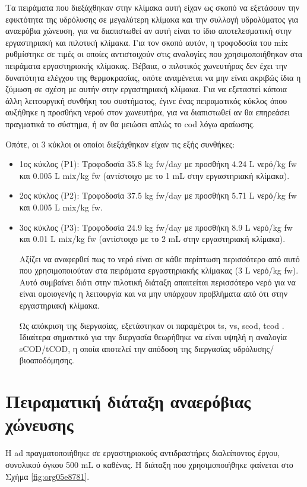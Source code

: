 \documentclass[11pt]{report}
\begin{document}
Τα πειράματα που διεξάχθηκαν στην κλίμακα αυτή είχαν ως σκοπό να εξετάσουν την εφικτότητα της υδρόλυσης σε μεγαλύτερη κλίμακα και την συλλογή υδρολύματος για αναερόβια χώνευση, για να διαπιστωθεί αν αυτή είναι το ίδιο αποτελεσματική στην εργαστηριακή και πιλοτική κλίμακα. Για τον σκοπό αυτόν, η τροφοδοσία του \acrshort{mix} ρυθμίστηκε σε τιμές οι οποίες αντιστοιχούν στις αναλογίες που χρησιμοποιήθηκαν στα πειράματα εργαστηριακής κλίμακας. Βέβαια, ο πιλοτικός χωνευτήρας δεν έχει την δυνατότητα ελέγχου της θερμοκρασίας, οπότε αναμένεται να μην είναι ακριβώς ίδια η ζύμωση σε σχέση με αυτήν στην εργαστηριακή κλίμακα. Για να εξεταστεί κάποια άλλη λειτουργική συνθήκη του συστήματος, έγινε ένας πειραματικός κύκλος όπου αυξήθηκε η προσθήκη νερού στον χωνευτήρα, για να διαπιστωθεί αν θα επηρεάσει πραγματικά το σύστημα, ή αν θα μειώσει απλώς το \acrshort{cod} λόγω αραίωσης.

Οπότε, οι 3 κύκλοι οι οποίοι διεξάχθηκαν είχαν τις εξής συνθήκες:
\begin{itemize}
\item 1ος κύκλος (P1): Τροφοδοσία 35.8 kg \acrshort{fw}/day με προσθήκη 4.24 L νερό/kg \acrshort{fw} και 0.005 L \acrshort{mix}/kg \acrshort{fw} (αντίστοιχο με το 1 mL στην εργαστηριακή κλίμακα).
\item 2ος κύκλος (P2): Τροφοδοσία 37.5 kg \acrshort{fw}/day με προσθήκη 5.71 L νερό/kg \acrshort{fw} και 0.005 L \acrshort{mix}/kg \acrshort{fw}.
\item 3ος κύκλος (P3): Τροφοδοσία 24.9 kg \acrshort{fw}/day με προσθήκη 8.9 L νερό/kg \acrshort{fw} και 0.01 L \acrshort{mix}/kg \acrshort{fw} (αντίστοιχο με το 2 mL στην εργαστηριακή κλίμακα).

Αξίζει να αναφερθεί πως το νερό είναι σε κάθε περίπτωση περισσότερο από αυτό που χρησιμοποιούταν στα πειράματα εργαστηριακής κλίμακας (3 L νερό/kg \acrshort{fw}). Αυτό συμβαίνει διότι στην πιλοτική διάταξη απαιτείται περισσότερο νερό για να είναι ομοιογενής η λειτουργία και να μην υπάρχουν προβλήματα από ότι στην εργαστηριακή κλίμακα.

Ως απόκριση της διεργασίας, εξετάστηκαν οι παραμέτροι \acrshort{ts}, \acrshort{vs}, \acrshort{scod}, \acrshort{tcod} . Ιδιαίτερα σημαντικό για την διεργασία θεωρήθηκε να είναι υψηλή η αναλογία sCOD/tCOD, η οποία αποτελεί την απόδοση της διεργασίας υδρόλυσης/βιοαποδόμησης.
\end{itemize}

\section{Πειραματική διάταξη αναερόβιας χώνευσης}
\label{sec:org13fa474}
Η \acrshort{ad} πραγματοποιήθηκε σε εργαστηριακούς αντιδραστήρες διαλείποντος έργου, συνολικού όγκου 500 mL ο καθένας. Η διάταξη που χρησιμοποιήθηκε φαίνεται στο Σχήμα \ref{fig:org05e8781}.
\end{document}

